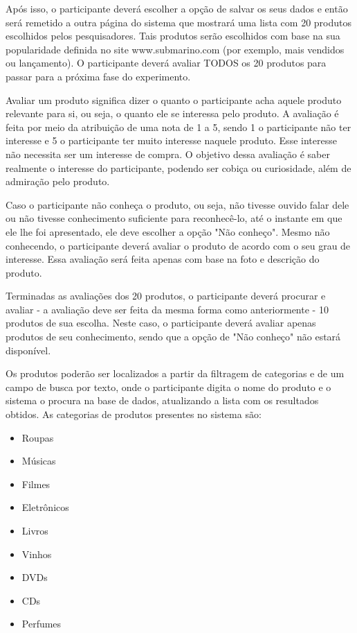  Após isso, o participante deverá escolher a opção de salvar os seus dados e então será remetido a outra página do sistema que mostrará uma lista com 20 produtos escolhidos pelos pesquisadores. Tais produtos serão escolhidos com base na sua popularidade definida no site www.submarino.com (por exemplo, mais vendidos ou lançamento). O participante deverá avaliar TODOS os 20 produtos para passar para a próxima fase do experimento.

 Avaliar um produto significa dizer o quanto o participante acha aquele produto relevante para si, ou seja, o quanto ele se interessa pelo produto. A avaliação é feita por meio da atribuição de uma nota de 1 a 5, sendo 1 o participante não ter interesse e 5 o participante ter muito interesse naquele produto. Esse interesse não necessita ser um interesse de compra. O objetivo dessa avaliação é saber realmente o interesse do participante, podendo ser cobiça ou curiosidade, além de admiração pelo produto.

 Caso o participante não conheça o produto, ou seja, não tivesse ouvido falar dele ou não tivesse conhecimento suficiente para reconhecê-lo, até o instante em que ele lhe foi apresentado, ele deve escolher a opção "Não conheço". Mesmo não conhecendo, o participante deverá avaliar o produto de acordo com o seu grau de interesse. Essa avaliação será feita apenas com base na foto e descrição do produto.

 Terminadas as avaliações dos 20 produtos, o participante deverá procurar e avaliar - a avaliação deve ser feita da mesma forma como anteriormente - 10 produtos de sua escolha. Neste caso, o participante deverá avaliar apenas produtos de seu conhecimento, sendo que a opção de "Não conheço" não estará disponível.

 Os produtos poderão ser localizados a partir da filtragem de categorias e de um campo de busca por texto, onde o participante digita o nome do produto e o sistema o procura na base de dados, atualizando a lista com os resultados obtidos. As categorias de produtos presentes no sistema são:

\begin{itemize}
	\item Roupas
	\item Músicas
	\item Filmes
	\item Eletrônicos
	\item Livros
	\item Vinhos
	\item DVDs
	\item CDs
	\item Perfumes
\end{itemize}

